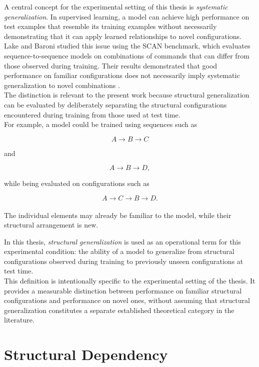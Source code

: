 \noindent
A central concept for the experimental setting of this thesis is \textit{systematic generalization}. In supervised learning, a model can achieve high performance on test examples that resemble its training examples without necessarily demonstrating that it can apply learned relationships to novel configurations.
\noindent\\
Lake and Baroni studied this issue using the SCAN benchmark, which evaluates sequence-to-sequence models on combinations of commands that can differ from those observed during training. Their results demonstrated that good performance on familiar configurations does not necessarily imply systematic generalization to novel combinations \cite{lake2018generalization}.
\noindent\\
The distinction is relevant to the present work because structural generalization can be evaluated by deliberately separating the structural configurations encountered during training from those used at test time.
\\
For example, a model could be trained using sequences such as

$$
A\rightarrow B\rightarrow C
$$

and

$$
A\rightarrow B\rightarrow D,
$$

while being evaluated on configurations such as

$$
A\rightarrow C\rightarrow B\rightarrow D.
$$
\noindent \\
The individual elements may already be familiar to the model, while their structural arrangement is new.

\noindent
In this thesis, \textit{structural generalization} is used as an operational term for this experimental condition: the ability of a model to generalize from structural configurations observed during training to previously unseen configurations at test time.
\noindent \\
This definition is intentionally specific to the experimental setting of the thesis. It provides a measurable distinction between performance on familiar structural configurations and performance on novel ones, without assuming that structural generalization constitutes a separate established theoretical category in the literature.

\section{Structural Dependency}

